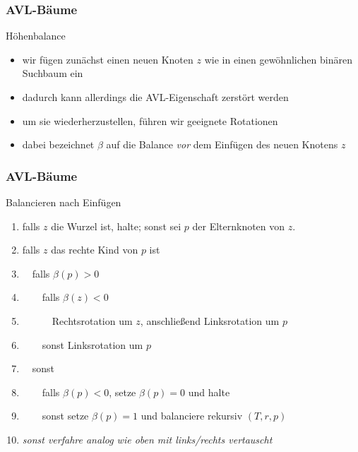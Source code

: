\documentclass[aspectratio=1610, 11pt]{beamer}
\newcommand{\mytitle}{AVL-B\"aume}
\begin{document}
\begin{frame}\frametitle{\mytitle}
	\begin{exampleblock}{H\"ohenbalance}
		\begin{itemize}
			\item wir f\"ugen zun\"achst einen neuen Knoten $z$ wie in einen gew\"ohnlichen bin\"aren Suchbaum ein
			\item dadurch kann allerdings die AVL-Eigenschaft zerst\"ort werden
			\item um sie wiederherzustellen, f\"uhren wir geeignete \alert{Rotationen}
			\item dabei bezeichnet $\beta$ auf die Balance {\em vor} dem Einf\"ugen des neuen Knotens $z$
		\end{itemize}
	\end{exampleblock}
\end{frame}

\begin{frame}\frametitle{\mytitle}
	\begin{exampleblock}{Balancieren nach Einf\"ugen}
		\begin{enumerate}
			\item falls $z$ die Wurzel ist, halte; sonst sei $p$ der Elternknoten von $z$.
			\item falls $z$ das rechte Kind von $p$ ist
			\item $\quad$falls $\beta(p)>0$
			\item $\qquad$falls $\beta(z)<0$
			\item $\quad\qquad$Rechtsrotation um $z$, anschlie\ss end Linksrotation um $p$
			\item $\qquad$sonst Linksrotation um $p$
			\item $\quad$sonst
			\item $\qquad$falls $\beta(p)<0$, setze $\beta(p)=0$ und halte
			\item $\qquad$sonst setze $\beta(p)=1$ und balanciere rekursiv $(T,r,p)$
			\item \itshape sonst verfahre analog wie oben mit links/rechts vertauscht
		\end{enumerate}
	\end{exampleblock}
\end{frame}
\end{document}
